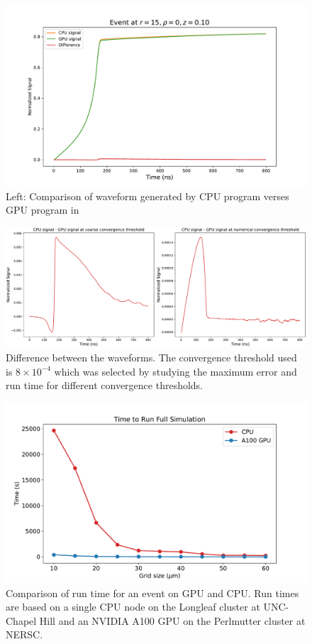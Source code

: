 \begin{figure}[!ht]
\centering
 \includegraphics[width=0.99\linewidth]{ch4/figs/cpu_gpu_wf.pdf}
\caption{ Left: Comparison of waveform generated by CPU program verses GPU program in {\ehd}}
\label{ch4_fig_waveform_comp}
\end{figure}

\begin{figure}[!ht]
\centering
 \includegraphics[width=0.99\linewidth]{ch4/figs/converge_threshold_dif.pdf}
\caption{Difference between the waveforms. The convergence threshold used is $8\times10^{-4}$ which was selected by studying the maximum error and run time for different convergence thresholds.}
\label{ch4_fig_cov_thres_diff} 
\end{figure}



\begin{figure}[!htb]
\centering
 \includegraphics[width=0.99\linewidth]{ch4/figs/cpu_gpu_comp.pdf}
\caption{ Comparison of run time for an {\ehd} event on GPU and CPU. Run times are based on a single CPU node on the Longleaf cluster at UNC-Chapel Hill and an NVIDIA A100 GPU on the Perlmutter cluster at NERSC.}
\label{fig:GPU_time}
\end{figure}


